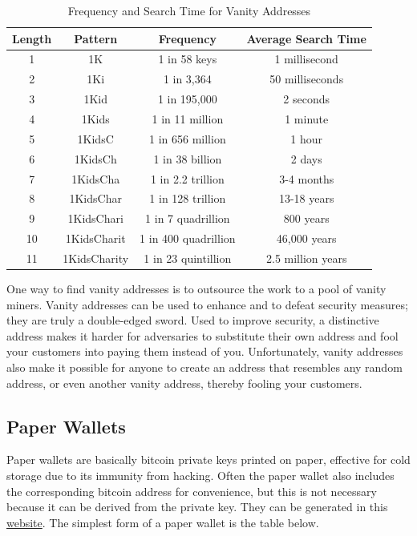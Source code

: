 \documentclass{article}
\begin{document}
    \begin{table}[H]
    \centering
    \begin{tabular}{|c|c|c|c|}
    \hline
    Length & Pattern & Frequency & Average Search Time \\
    \hline
    1 & 1K & 1 in 58 keys & 1 millisecond \\
    2 & 1Ki & 1 in 3,364 & 50 milliseconds \\
    3 & 1Kid & 1 in 195,000 & 2 seconds \\
    4 & 1Kids & 1 in 11 million & 1 minute \\
    5 & 1KidsC & 1 in 656 million & 1 hour \\
    6 & 1KidsCh & 1 in 38 billion & 2 days \\
    7 & 1KidsCha & 1 in 2.2 trillion & 3-4 months \\
    8 & 1KidsChar & 1 in 128 trillion & 13-18 years \\
    9 & 1KidsChari & 1 in 7 quadrillion & 800 years \\
    10 & 1KidsCharit & 1 in 400 quadrillion & 46,000 years \\
    11 & 1KidsCharity & 1 in 23 quintillion & 2.5 million years \\
    \hline
    \end{tabular}
    \caption{Frequency and Search Time for Vanity Addresses}
    \end{table}

    One way to find vanity addresses is to outsource the work to a pool of vanity miners. Vanity addresses can be used to enhance and to defeat security measures; they are truly a double-edged sword. Used to improve security, a distinctive address makes it harder for adversaries to substitute their own address and fool your customers into paying them instead of you. Unfortunately, vanity addresses also make it possible for anyone to create an address that resembles any random address, or even another vanity address, thereby fooling your customers.

  \subsection{Paper Wallets}

    Paper wallets are basically bitcoin private keys printed on paper, effective for cold storage due to its immunity from hacking. Often the paper wallet also includes the corresponding bitcoin address for convenience, but this is not necessary because it can be derived from the private key. They can be generated in this \href{bitaddress.org}{website}. The simplest form of a paper wallet is the table below.
\end{document}
